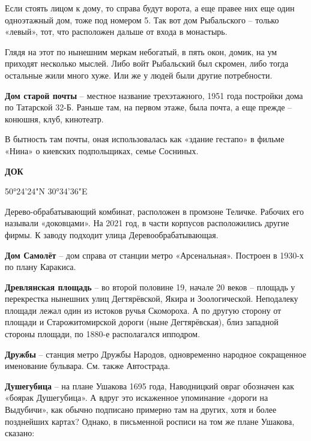 Если стоять лицом к дому, то справа будут ворота, а еще правее них еще один одноэтажный дом, тоже под номером 5. Так вот дом Рыбальского – только «левый», тот, что расположен дальше от входа в монастырь.

Глядя на этот по нынешним меркам небогатый, в пять окон, домик, на ум приходят несколько мыслей. Либо войт Рыбальский был скромен, либо тогда остальные жили много хуже. Или же у людей были другие потребности.\\

\medskip

\textbf{Дом старой почты} – местное название трехэтажного, 1951 года постройки дома по Татарской 32-Б. Раньше там, на первом этаже, была почта, а еще прежде – конюшня, клуб, кинотеатр.

В бытность там почты, оная использовалась как «здание гестапо» в фильме «Нина» о киевских подпольщиках, семье Сосниных.\\

\medskip

\textbf{ДОК}

50°24'24"N 30°34'36"E

Дерево-обрабатывающий комбинат, расположен в промзоне Теличке. Рабочих его называли «доковцами». На 2021 год, в части корпусов расположились другие фирмы. К заводу подходит улица Деревообрабатывающая.\\

\medskip

\textbf{Дом Самолёт} – дом справа от станции метро «Арсенальная». Построен в 1930-х по плану Каракиса.\\

\medskip

\textbf{Древлянская площадь} – во второй половине 19, начале 20 веков – площадь у перекрестка нынешних улиц Дегтярёвской, Якира и Зоологической. Неподалеку площади лежал один из истоков ручья Скомороха. А по другую сторону от площади и Старожитомирской дороги (ныне Дегтярёвская), близ западной стороны площади, по 1880-е располагался ипподром.\\

\medskip

\textbf{Дружбы} – станция метро Дружбы Народов, одновременно народное сокращенное именование бульвара. См. также Автострада.\\

\medskip

\textbf{Душегубица} – на плане Ушакова 1695 года, Наводницкий овраг обозначен как «боярак Душегубица». А вдруг это искаженное упоминание «дороги на Выдубичи», как обычно подписано примерно там на других, хотя и более позднейших картах? Однако, в письменной росписи на том же плане Ушакова, сказано:

